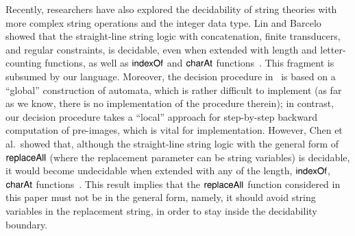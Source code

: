 Recently, researchers have also explored the decidability of string theories with more complex string operations and the integer data type. Lin and Barcelo showed that the straight-line string logic with concatenation, finite transducers, and regular constraints, is decidable, even when extended with length and letter-counting functions, as well as $\mathsf{indexOf}$ and $\mathsf{charAt}$ functions~\cite{LB16}. 
This fragment is subsumed by our language. Moreover, the decision procedure in~\cite{LB16} is based on a ``global'' construction of automata, which is rather difficult to implement (as far as we know, there is no implementation of the procedure therein); in contrast, our decision procedure takes a ``local'' approach for step-by-step backward computation of pre-images, which is vital for implementation. 
However, Chen et al.\ showed that, although the straight-line string logic with the general form of $\mathsf{replaceAll}$ (where the replacement parameter can be string variables) is decidable, it would become undecidable when extended with any of the length, $\mathsf{indexOf}$, $\mathsf{charAt}$ functions~\cite{CCH+18}. 
This result implies that the $\mathsf{replaceAll}$ function considered in this paper must not be in the general form, namely, it should avoid string variables in the replacement string, in order to stay inside the decidability boundary. 



